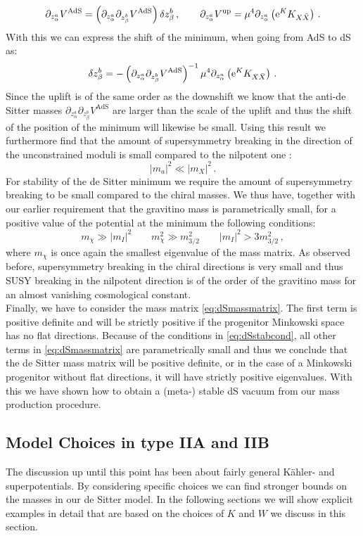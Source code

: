 \documentclass[a4paper,12pt]{report}
\newcommand{\be}{\begin{equation}}
\newcommand{\ee}{\end{equation}}
\def\rme{{\rm e}}
\begin{document}
\be 
\partial_{z^a_{\alpha}} V^{\text{AdS}}=\left(\partial_{z^a_\alpha } \partial_{z^b_\beta} V^{\text{AdS}} \right) \delta z^b_\beta\,, \qquad \partial_{z^a_{\alpha}} V^{\text{up}} = \mu^4 \partial_{z^a_\alpha} \left(\rme^K K_{X\bar{X}}\right)\,.
\ee
With this we can express the shift of the minimum, when going from AdS to dS as:
\be 
\delta z^b_\beta = -\left( \partial_{z_\alpha^a}\partial_{z^b_\beta} V^{\text{AdS}}\right)^{-1} \mu^4 \partial_{z^a_\alpha} \left(\rme^K K_{X\bar{X}}\right)\,.
\ee
Since the uplift is of the same order as the downshift we know that the anti-de Sitter masses $\partial_{z_\alpha^a}\partial_{z^b_\beta} V^{\text{AdS}}$ are larger than the scale of the uplift and thus the shift of the position of the minimum will likewise be small. Using this result we furthermore find that the amount of supersymmetry breaking in the direction of the unconstrained moduli is small compared to the nilpotent one \cite{Linde:2011ja}:
\be 
|m_a|^2 \ll |m_X|^2\,.
\ee
For stability of the de Sitter minimum we require the amount of supersymmetry breaking to be small compared to the chiral masses. We thus have, together with our earlier requirement that the gravitino mass is parametrically small, for a positive value of the potential at the minimum the following conditions:
\be 
m_\chi \gg |m_I|^2\qquad m_\chi^2 \gg m^2_{3/2} \qquad |m_I|^2 > 3 m_{3/2}^2\,,
\label{eq:dSstabcond}
\ee
where $m_\chi$ is once again the smallest eigenvalue of the mass matrix. As observed before, supersymmetry breaking in the chiral directions is very small and thus SUSY breaking in the nilpotent direction is of the order of the gravitino mass for an almost vanishing cosmological constant.\\
Finally, we have to consider the mass matrix \eqref{eq:dSmassmatrix}. The first term is positive definite and will be strictly positive if the progenitor Minkowski space has no flat directions. Because of the conditions in \eqref{eq:dSstabcond}, all other terms in \eqref{eq:dSmassmatrix} are parametrically small and thus we conclude that the de Sitter mass matrix will be positive definite, or in the case of a Minkowski progenitor without flat directions, it will have strictly  positive eigenvalues. With this we have shown how to obtain a (meta-) stable dS vacuum from our mass production procedure.

\subsection{Model Choices in type IIA and IIB}
The discussion up until this point has been about fairly general Kähler- and superpotentials. By considering specific choices we can find stronger bounds on the masses in our de Sitter model. In the following sections we will show explicit examples in detail that are based on the choices of $K$ and $W$ we discuss in this section. 
\end{document}

